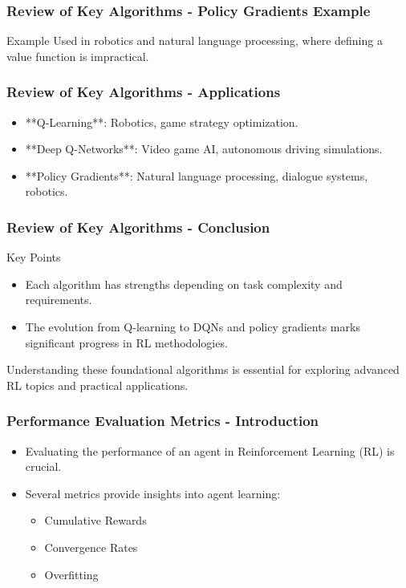 \documentclass[aspectratio=169]{beamer}
\begin{document}
\begin{frame}[fragile]
    \frametitle{Review of Key Algorithms - Policy Gradients Example}
    \begin{block}{Example}
        Used in robotics and natural language processing, where defining a value function is impractical.
    \end{block}
\end{frame}

\begin{frame}[fragile]
    \frametitle{Review of Key Algorithms - Applications}
    \begin{itemize}
        \item **Q-Learning**: Robotics, game strategy optimization.
        \item **Deep Q-Networks**: Video game AI, autonomous driving simulations.
        \item **Policy Gradients**: Natural language processing, dialogue systems, robotics.
    \end{itemize}
\end{frame}

\begin{frame}[fragile]
    \frametitle{Review of Key Algorithms - Conclusion}
    \begin{block}{Key Points}
        \begin{itemize}
            \item Each algorithm has strengths depending on task complexity and requirements.
            \item The evolution from Q-learning to DQNs and policy gradients marks significant progress in RL methodologies.
        \end{itemize}
    \end{block}
    Understanding these foundational algorithms is essential for exploring advanced RL topics and practical applications.
\end{frame}

\begin{frame}[fragile]
    \frametitle{Performance Evaluation Metrics - Introduction}
    \begin{itemize}
        \item Evaluating the performance of an agent in Reinforcement Learning (RL) is crucial.
        \item Several metrics provide insights into agent learning:
        \begin{itemize}
            \item Cumulative Rewards
            \item Convergence Rates
            \item Overfitting
        \end{itemize}
    \end{itemize}
\end{frame}
\end{document}
